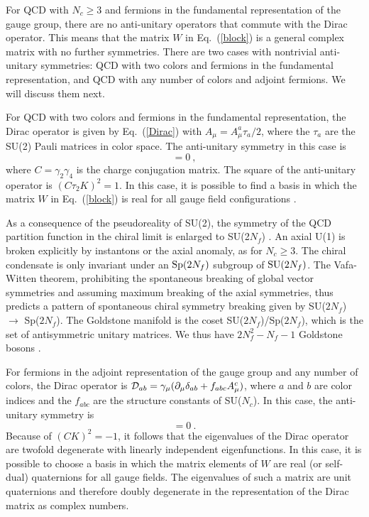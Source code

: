For QCD with $N_c\ge3$ and fermions in the fundamental representation
of the gauge group, there are no anti-unitary operators that commute
with the Dirac operator.  This means that the matrix $W$ in
Eq.~(\ref{block}) is a general complex matrix with no further
symmetries. There are two cases with nontrivial anti-unitary
symmetries: QCD with two colors and fermions in the fundamental
representation, and QCD with any number of colors and adjoint
fermions. We will discuss them next.


For QCD with two colors and fermions in the fundamental representation,
the Dirac operator is given by Eq.~(\ref{Dirac}) with
$A_\mu=A_\mu^a\tau_a/2$, where the $\tau_a$ are the SU(2) Pauli
matrices in color space.  The anti-unitary symmetry in this case is
\cite{Leut92,Verb94a}
\begin{equation}
  [C\tau_2K,i{\cal D}]=0 \:,
\end{equation} 
where $C=\gamma_2\gamma_4$ is the charge conjugation matrix.  The
square of the anti-unitary operator is $(C\tau_2K)^2=1$.  In this
case, it is possible to find a basis in
which the matrix $W$ in Eq.~(\ref{block}) is real for all gauge
field configurations \cite{Porter}.

As a consequence of the pseudoreality of SU(2),
the symmetry of the QCD partition function in
the chiral limit is enlarged to SU(2$N_f$)  \cite{peskin,SmV,Toub99}.
An axial U(1) is 
broken explicitly by instantons or the axial anomaly, as for $N_c\ge3$.
The chiral condensate is only invariant under an ${\rm Sp}(2N_f)$
subgroup of ${\rm SU}(2N_f)$.  The Vafa-Witten theorem, prohibiting
the spontaneous breaking of global vector symmetries and assuming
maximum breaking of the axial symmetries, thus predicts a pattern of
spontaneous chiral symmetry breaking given by SU($2N_f$) $\to$
Sp($2N_f$).  The Goldstone manifold is the coset SU($2N_f$)/Sp($2N_f$),
which is the set of antisymmetric unitary matrices. We thus have
$2N_f^2-N_f-1$ Goldstone bosons \cite{SmV,Toub99}.

For fermions in the adjoint representation of the gauge group and any
number of colors, the Dirac operator is ${\cal
  D}_{ab}=\gamma_\mu(\partial_\mu\delta_{ab}+ f_{abc}A_\mu^c)$, where
$a$ and $b$ are color indices and the $f_{abc}$ are the structure
constants of SU($N_c$).  In this case, the anti-unitary symmetry is
\cite{Leut92,Verb94a}
\begin{equation}
  [CK,i{\cal D}]=0 \:.  
\end{equation} 
Because of $(CK)^2=-1$, it follows that the eigenvalues of the Dirac
operator are twofold degenerate with linearly independent
eigenfunctions. In this case, it is possible to choose a basis in which
the matrix elements of $W$ are real (or self-dual) quaternions for
all gauge fields. The eigenvalues of such a matrix are unit
quaternions and therefore doubly degenerate \cite{Dyso62} in the
representation of the Dirac matrix as complex numbers.

